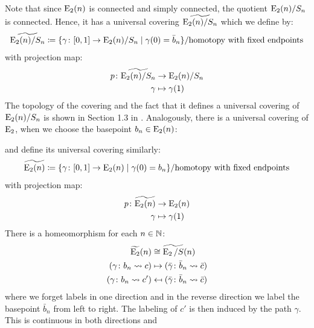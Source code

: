 \begin{const}
Note that since $\operatorname{E}_2(n)$ is connected and simply connected, the quotient $\operatorname{E}_2
(n) \slash S_n$ is connected. Hence, it has a universal covering
$\widetilde{\operatorname{E}_2(n) \slash S_n}$ which we define by:
\[
    \widetilde{\operatorname{E}_2(n) \slash S_n} \coloneq \{ \gamma \colon [0,1] \to \operatorname{E}_2(n) \slash S_n \mid \gamma(0) = \bar{b}_n \} 
    \slash \text{homotopy with fixed endpoints}
\]
with projection map:
\begin{align*}
    p \colon \widetilde{\operatorname{E}_2(n) \slash S_n} &\to \operatorname{E}_2(n) \slash S_n \\
    \gamma &\mapsto \gamma(1)
\end{align*}
The topology of the covering and the fact that it defines a universal covering
of $\operatorname{E}_2(n) \slash S_n$ is shown in Section 1.3 in \cite{Hatcher}. Analogously,
there is a universal covering of $\operatorname{E}_2$, when we choose the
basepoint $b_n \in \operatorname{E}_2(n)$:
\begin{center}
\end{center}
and define its universal covering similarly:
\[
    \widetilde{\operatorname{E}_2(n)} \coloneq \{ \gamma \colon [0,1] \to \operatorname{E}_2(n) \mid \gamma(0) = b_n \} 
    \slash \text{homotopy with fixed endpoints}
\]
with projection map:
\begin{align*}
    p \colon \widetilde{\operatorname{E}_2(n)} &\to \operatorname{E}_2(n) \\
    \gamma &\mapsto \gamma(1)
\end{align*}
There is a homeomorphism for each $n \in \mathbb{N}$:
\begin{align*}
    \widetilde{\operatorname{E}_2}(n) &\cong \widetilde{\operatorname{E}_2 \slash S}(n) \\
    (\gamma \colon b_n \rightsquigarrow c) &\mapsto (\bar{\gamma} \colon \bar{b}_n \rightsquigarrow \bar{c}) \\
    (\gamma \colon b_n \rightsquigarrow c') &\mapsfrom (\bar{\gamma} \colon \bar{b}_n \rightsquigarrow \bar{c}) \\
\end{align*}
where we forget labels in one direction and in the reverse direction we label
the basepoint $\bar{b}_n$ from left to right. The labeling of $c'$ is then
induced by the path $\gamma$. This is continuous in both directions and

\end{const}
